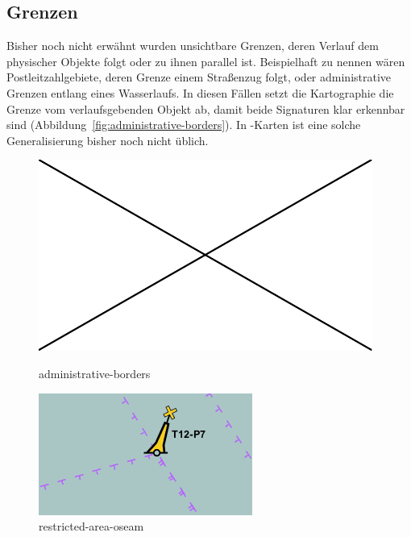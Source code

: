 \documentclass[../main/thesis.tex]{subfiles}
\begin{document}
\subsection{Grenzen}

Bisher noch nicht erwähnt wurden unsichtbare Grenzen, deren Verlauf dem physischer Objekte folgt oder zu ihnen parallel ist.
Beispielhaft zu nennen wären Postleitzahlgebiete, deren Grenze einem Straßenzug folgt, oder administrative Grenzen entlang eines Wasserlaufs.
In diesen Fällen setzt die Kartographie die Grenze vom verlaufsgebenden Objekt ab, damit beide Signaturen klar erkennbar sind (Abbildung~\ref{fig:administrative-borders}).
In \osm-Karten ist eine solche Generalisierung bisher noch nicht üblich.

\begin{figure}[ht]
  \begin{minipage}[t]{.5\linewidth}
    \centering
    \includegraphics[width=\ScaleIfNeeded]{../image-missing}
    \caption{administrative-borders}\label{fig:administrative-borders}
  \end{minipage}%
  \begin{minipage}[t]{.5\linewidth}
    \centering
    \includegraphics[width=\ScaleIfNeeded]{../chapter3/restricted-area-oseam}
    \caption{restricted-area-oseam}\label{fig:restricted-area-oseam}
  \end{minipage}
\end{figure}
\end{document}
